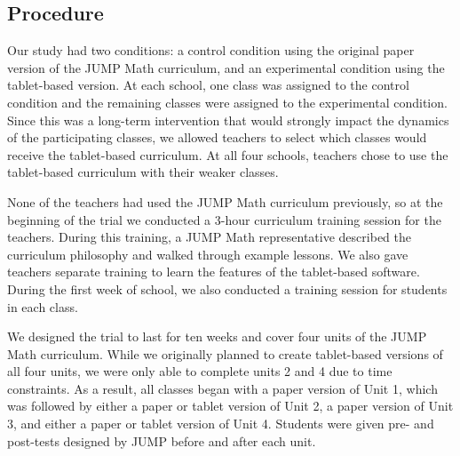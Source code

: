 \documentclass{sigchi}
\begin{document}

\subsection{Procedure}
Our study had two conditions: a control condition using the original paper version of the JUMP Math curriculum, and an experimental condition using the tablet-based version. At each school, one class was assigned to the control condition and the remaining classes were assigned to the experimental condition. Since this was a long-term intervention that would strongly impact the dynamics of the participating classes, we allowed teachers to select which classes would receive the tablet-based curriculum. At all four schools, teachers chose to use the tablet-based curriculum with their weaker classes.

None of the teachers had used the JUMP Math curriculum previously, so at the beginning of the trial we conducted a 3-hour curriculum training session for the teachers. During this training, a JUMP Math representative described the curriculum philosophy and walked through example lessons. We also gave teachers separate training to learn the features of the tablet-based software. During the first week of school, we also conducted a  training session for students in each class.

We designed the trial to last for ten weeks and cover four units of the JUMP Math curriculum. While we originally planned to create tablet-based versions of all four units, we were only able to complete units 2 and 4 due to time constraints. As a result, all classes began with a paper version of Unit 1, which was followed by either a paper or tablet version of Unit 2, a paper version of Unit 3, and either a paper or tablet version of Unit 4. Students were given pre- and post-tests designed by JUMP before and after each unit.
\end{document}

